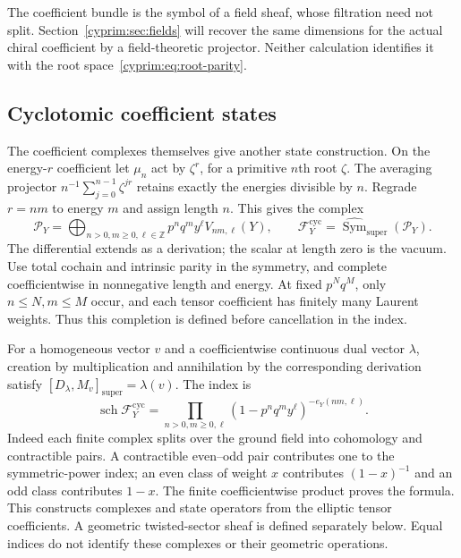 The coefficient bundle is the symbol of a field sheaf, whose
filtration need not split. Section~\ref{cyprim:sec:fields}
will recover the same dimensions for the actual chiral
coefficient by a field-theoretic projector. Neither calculation
identifies it with the root space~\eqref{cyprim:eq:root-parity}.

\subsection{Cyclotomic coefficient states}

The coefficient complexes themselves give another state
construction. On the energy-$r$ coefficient let $\mu_n$
act by $\zeta^r$, for a primitive $n$th root $\zeta$.
The averaging projector $n^{-1}\sum_{j=0}^{n-1}\zeta^{jr}$
retains exactly the energies divisible by $n$.
Regrade $r=nm$ to energy $m$ and assign length $n$.
This gives the complex
\[
 \mathcal P_Y=\bigoplus_{n>0,m\ge0,\ell\in\mathbb Z}
       p^nq^my^\ell V_{nm,\ell}(Y),
 \qquad
 \mathcal F_Y^{\mathrm{cyc}}
       =\widehat{\operatorname{Sym}}_{\mathrm{super}}(\mathcal P_Y).
\]
The differential extends as a derivation; the scalar at
length zero is the vacuum. Use total cochain and intrinsic
parity in the symmetry, and complete coefficientwise in
nonnegative length and energy. At fixed $p^Nq^M$, only
$n\le N,m\le M$ occur, and each tensor coefficient has
finitely many Laurent weights. Thus this completion is
defined before cancellation in the index.

For a homogeneous vector $v$ and a coefficientwise
continuous dual vector $\lambda$, creation by multiplication
and annihilation by the corresponding derivation satisfy
$[D_\lambda,M_v]_{\mathrm{super}}=\lambda(v)$.
The index is
\begin{equation}\label{cyprim:eq:cyclotomic-index}
 \operatorname{sch}\mathcal F_Y^{\mathrm{cyc}}
 =\prod_{n>0,m\ge0,\ell}
       (1-p^nq^my^\ell)^{-e_Y(nm,\ell)}.
\end{equation}
Indeed each finite complex splits over the ground field
into cohomology and contractible pairs. A contractible
even--odd pair contributes one to the symmetric-power
index; an even class of weight $x$ contributes
$(1-x)^{-1}$ and an odd class contributes $1-x$.
The finite coefficientwise product proves the formula.
This constructs complexes and state operators from the
elliptic tensor coefficients. A geometric twisted-sector
sheaf is defined separately below. Equal indices do not
identify these complexes or their geometric operations.

